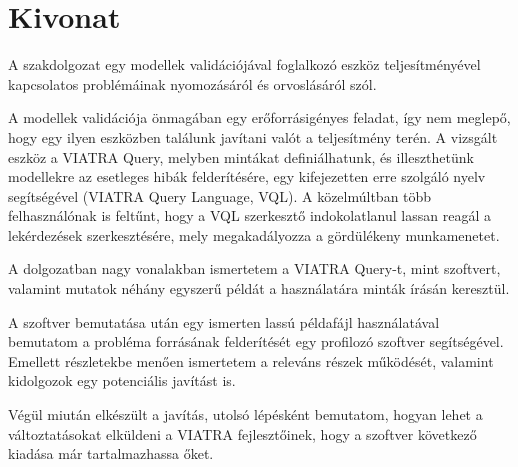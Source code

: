 \documentclass[11pt,a4paper,oneside]{report}
\begin{document}
\selectthesislanguage

\tableofcontents\cleardoublepage



\setcounter{page}{1}

\selecthungarian
\chapter*{Kivonat}
\par
A szakdolgozat egy modellek validációjával foglalkozó eszköz teljesítményével
kapcsolatos problémáinak nyomozásáról és orvoslásáról szól.
\medskip
\par
A modellek validációja önmagában egy erőforrásigényes feladat, így nem
meglepő, hogy egy ilyen eszközben találunk javítani valót a teljesítmény terén.
A vizsgált eszköz a VIATRA Query, melyben mintákat definiálhatunk, és
illeszthetünk modellekre az esetleges hibák felderítésére, egy kifejezetten erre
szolgáló nyelv segítségével (VIATRA Query Language, VQL). A közelmúltban több
felhasználónak is feltűnt, hogy a VQL szerkesztő indokolatlanul lassan reagál
a lekérdezések szerkesztésére, mely megakadályozza a gördülékeny munkamenetet.
\medskip
\par
A dolgozatban nagy vonalakban ismertetem a VIATRA Query-t, mint szoftvert,
valamint mutatok néhány egyszerű példát a használatára minták írásán keresztül.
\medskip
\par
A szoftver bemutatása után egy ismerten lassú példafájl használatával bemutatom
a probléma forrásának felderítését egy profilozó szoftver segítségével. Emellett
részletekbe menően ismertetem a releváns részek működését, valamint kidolgozok
egy potenciális javítást is.
\medskip
\par
Végül miután elkészült a javítás, utolsó lépésként bemutatom, hogyan lehet a
változtatásokat elküldeni a VIATRA fejlesztőinek, hogy a szoftver következő
kiadása már tartalmazhassa őket.
\vfill

\selectenglish
\end{document}
